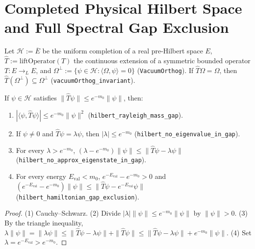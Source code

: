 \section{Completed Physical Hilbert Space and Full Spectral Gap Exclusion}
\label{sec:ch5}

Let $\mathcal{H} := \overline{E}$ be the uniform completion of a real pre-Hilbert space $E$, $\widehat{T} := \mathrm{liftOperator}(T)$ the continuous extension of a symmetric bounded operator $T : E \to_L E$, and $\Omega^\perp := \{\psi \in \mathcal{H} : \langle \Omega, \psi \rangle = 0\}$ (\texttt{VacuumOrthog}). If $\widehat{T}\Omega = \Omega$, then $\widehat{T}(\Omega^\perp) \subseteq \Omega^\perp$ (\texttt{vacuumOrthog\_invariant}).

\begin{theorem}
\label{thm:spectral_exclusion}
If $\psi \in \mathcal{H}$ satisfies $\|\widehat{T}\psi\| \le e^{-m_0}\|\psi\|$, then:
\begin{enumerate}
    \item $|\langle \psi, \widehat{T}\psi \rangle| \le e^{-m_0} \|\psi\|^2$ (\texttt{hilbert\_rayleigh\_mass\_gap}).
    \item If $\psi \neq 0$ and $\widehat{T}\psi = \lambda \psi$, then $|\lambda| \le e^{-m_0}$ (\texttt{hilbert\_no\_eigenvalue\_in\_gap}).
    \item For every $\lambda > e^{-m_0}$, $(\lambda - e^{-m_0})\|\psi\| \le \|\widehat{T}\psi - \lambda \psi\|$ (\texttt{hilbert\_no\_approx\_eigenstate\_in\_gap}).
    \item For every energy $E_{\mathrm{val}} < m_0$, $e^{-E_{\mathrm{val}}} - e^{-m_0} > 0$ and $(e^{-E_{\mathrm{val}}} - e^{-m_0})\|\psi\| \le \|\widehat{T}\psi - e^{-E_{\mathrm{val}}}\psi\|$ (\texttt{hilbert\_hamiltonian\_gap\_exclusion}).
\end{enumerate}
\end{theorem}

\begin{proof}
(1) Cauchy--Schwarz. (2) Divide $|\lambda|\|\psi\| \le e^{-m_0}\|\psi\|$ by $\|\psi\| > 0$. (3) By the triangle inequality, $\lambda\|\psi\| = \|\lambda\psi\| \le \|\widehat{T}\psi - \lambda\psi\| + \|\widehat{T}\psi\| \le \|\widehat{T}\psi - \lambda\psi\| + e^{-m_0}\|\psi\|$. (4) Set $\lambda = e^{-E_{\mathrm{val}}} > e^{-m_0}$.
\end{proof}
